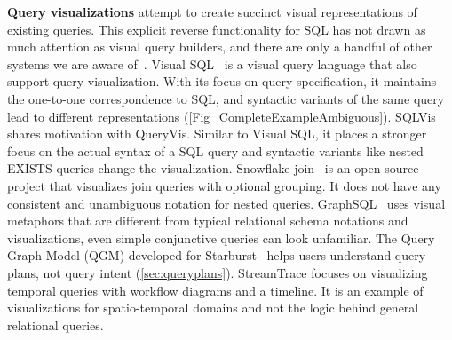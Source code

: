 \documentclass[letterpaper,11pt]{article}
\newcommand{\queryvis}{\textsf{QueryVis}\xspace}
\begin{document}



%
%
%
%







\textbf{Query visualizations}
%
%
%
%
attempt to create succinct visual representations of existing queries.
%
%
This explicit reverse functionality for SQL has not drawn as much attention as visual query builders,
and there are only a handful of other systems we are aware of~\cite{gatterbauer:diagrams:tutorial:2022}.
%
%
Visual SQL~\cite{DBLP:conf/er/JaakkolaT03} is 
a visual query language that also support query visualization. 
With its focus on query specification, it maintains the one-to-one correspondence to SQL,
and syntactic variants of the same query lead to different representations (\autoref{Fig_CompleteExampleAmbiguous}).
SQLVis~\cite{DBLP:conf/vl/MiedemaF21} shares motivation with \queryvis. 
Similar to Visual SQL, it places a stronger focus on the actual syntax of a SQL query 
and syntactic variants like nested EXISTS queries change the visualization.
%
%
%
%
%
Snowflake join~\cite{snowflakejoin} is an open source project that visualizes join queries with optional grouping.
It does not have any consistent and unambiguous notation for nested queries.
%
GraphSQL~\cite{DBLP:conf/dexaw/CerulloP07} uses visual metaphors that are different from typical relational schema notations 
%
%
and visualizations, even simple conjunctive queries can look unfamiliar.
%
The Query Graph Model (QGM) developed for Starburst~\cite{DBLP:conf/sigmod/HaasFLP89}
helps users understand query plans, not query intent (\autoref{sec:queryplans}).
%
StreamTrace \cite{DBLP:conf/chi/BattleFDBCG16}
focuses on visualizing temporal queries
%
with
workflow diagrams and a timeline.
It is an example of visualizations for spatio-temporal domains and not the logic behind general relational queries.








\end{document}
